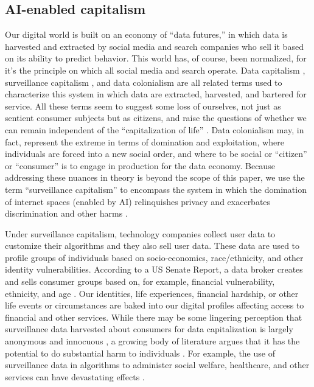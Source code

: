 \documentclass[11pt,dvipdfm]{article}
\begin{document}
\subsection{AI-enabled capitalism}
Our digital world is built on an economy of “data futures,” in which data is harvested and extracted by social media and search companies who sell it based on its ability to predict behavior. This world has, of course, been normalized, for it’s the principle on which all social media and search operate. Data capitalism \cite{12,34,52}, surveillance capitalism \cite{59}, and data colonialism \cite{11,12} are all related terms used to characterize this system in which data are extracted, harvested, and bartered for service. All these terms seem to suggest some loss of ourselves, not just as sentient consumer subjects but as citizens, and raise the questions of whether we can remain independent of the “capitalization of life” \cite{11}. Data colonialism may, in fact, represent the extreme in terms of domination and exploitation, where individuals are forced into a new social order, and where to be social or ``citizen'' or ``consumer'' is to engage in production for the data economy. Because addressing these nuances in theory is beyond the scope of this paper, we use the term “surveillance capitalism” to encompass the system in which the domination of internet spaces (enabled by AI) relinquishes privacy and exacerbates discrimination and other harms \cite{60}. 

Under surveillance capitalism, technology companies collect user data to customize their algorithms and they also sell user data. These data are used to profile groups of individuals based on socio-economics, race/ethnicity, and other identity vulnerabilities. According to a US Senate Report, a data broker creates and sells consumer groups based on, for example, financial vulnerability, ethnicity, and age \cite{16}. Our identities, life experiences, financial hardship, or other life events or circumstances are baked into our digital profiles affecting access to financial and other services. While there may be some lingering perception that surveillance data harvested about consumers for data capitalization is largely anonymous and innocuous \cite{44}, a growing body of literature argues that it has the potential to do substantial harm to individuals \cite{2,35}. For example, the use of surveillance data in algorithms to administer social welfare, healthcare, and other services can have devastating effects \cite{18,19}. 
\end{document}
